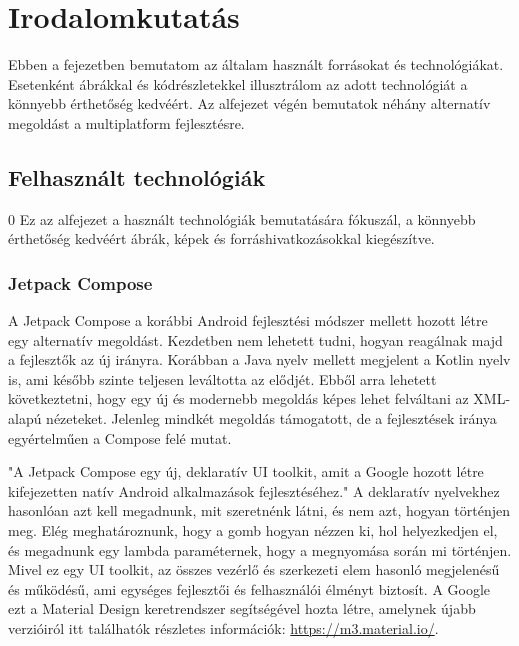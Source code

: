 \chapter{Irodalomkutatás}
\label{sec:Search}

Ebben a fejezetben bemutatom az általam használt forrásokat és technológiákat.  
Esetenként ábrákkal és kódrészletekkel illusztrálom az adott technológiát a könnyebb érthetőség kedvéért.  
Az alfejezet végén bemutatok néhány alternatív megoldást a multiplatform fejlesztésre.

\section{Felhasznált technológiák}
\label{sec:Technologies}
0
Ez az alfejezet a használt technológiák bemutatására fókuszál, a könnyebb érthetőség kedvéért ábrák, képek és forráshivatkozásokkal kiegészítve. 

\subsection{Jetpack Compose}
\label{sec:JetpackCompose}

A Jetpack Compose a korábbi Android fejlesztési módszer mellett hozott létre egy alternatív megoldást.  
Kezdetben nem lehetett tudni, hogyan reagálnak majd a fejlesztők az új irányra.  
Korábban a Java nyelv mellett megjelent a Kotlin nyelv is, ami később szinte teljesen leváltotta az elődjét.  
Ebből arra lehetett következtetni, hogy egy új és modernebb megoldás képes lehet felváltani az XML-alapú nézeteket.  
Jelenleg mindkét megoldás támogatott, de a fejlesztések iránya egyértelműen a Compose felé mutat.

"A Jetpack Compose egy új, deklaratív UI toolkit, amit a Google hozott létre kifejezetten natív Android alkalmazások fejlesztéséhez." \cite{GettingStartedWithJetpackCompose}  
A deklaratív nyelvekhez hasonlóan azt kell megadnunk, mit szeretnénk látni, és nem azt, hogyan történjen meg.  
Elég meghatároznunk, hogy a gomb hogyan nézzen ki, hol helyezkedjen el, és megadnunk egy lambda paraméternek, hogy a megnyomása során mi történjen.  
Mivel ez egy UI toolkit, az összes vezérlő és szerkezeti elem hasonló megjelenésű és működésű, ami egységes fejlesztői és felhasználói élményt biztosít.  
A Google ezt a Material Design keretrendszer segítségével hozta létre, amelynek újabb verzióiról itt találhatók részletes információk: \url{https://m3.material.io/}.

